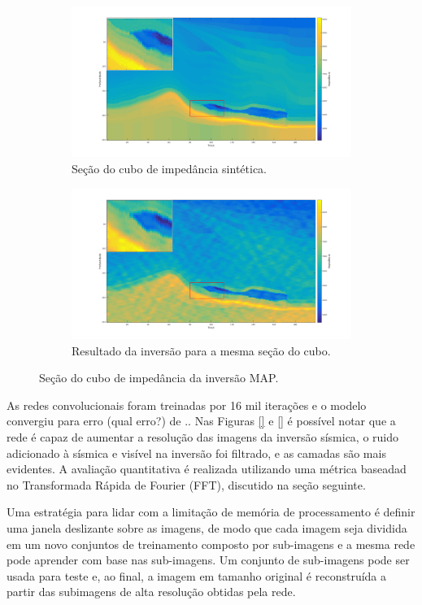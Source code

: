 \begin{figure}[htp]
\centering
\begin{subfigure}{.8\textwidth}
  \centering
  \includegraphics[width=.9\linewidth]{fig/impedance_mount}
  \caption{Seção do cubo de impedância sintética.}
  \label{fig:impedancehr}
\end{subfigure}
\begin{subfigure}{.8\textwidth}
  \centering
  \includegraphics[width=.9\linewidth]{fig/inversion_mount}
  \caption{Resultado da inversão para a mesma seção do cubo.}
  \label{fig:impedancelr}
\end{subfigure}%
\caption{Seção do cubo de impedância da inversão MAP.}
\label{fig:ipedances}
\end{figure}

As redes convolucionais foram treinadas por 16 mil iterações e o modelo convergiu para erro (qual erro?) de ..
Nas Figuras \ref{} e \ref{} é possível notar que a rede é capaz de aumentar a resolução das imagens
da inversão sísmica, o ruido adicionado à sísmica e visível na inversão foi filtrado, e as camadas são mais evidentes.
A avaliação quantitativa é realizada utilizando uma métrica baseadad no Transformada Rápida de Fourier (FFT),
discutido na seção seguinte.

Uma estratégia para lidar com a limitação de memória de processamento é definir uma janela deslizante sobre as imagens, de
modo que cada imagem seja dividida em um novo conjuntos de treinamento composto por sub-imagens e a mesma rede pode
aprender com base nas sub-imagens. Um conjunto de sub-imagens pode ser usada para teste e, ao final, a imagem em tamanho
original é reconstruída a partir das subimagens de alta resolução obtidas pela rede.

